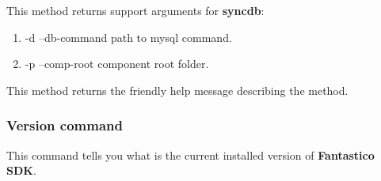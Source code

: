 \documentclass[letterpaper,10pt,english]{sphinxmanual}
\begin{document}
\begin{fulllineitems}
\begin{fulllineitems}
\begin{quote}
\begin{description}
\end{description}\end{quote}

\end{fulllineitems}


\begin{fulllineitems}
\label{features/sdk/command_syncdb:fantastico.sdk.commands.command_syncdb.SdkCommandSyncDb.get_arguments}
This method returns support arguments for \textbf{syncdb}:
\begin{enumerate}
\item {} 
-d --db-command path to mysql command.

\item {} 
-p --comp-root component root folder.

\end{enumerate}

\end{fulllineitems}


\begin{fulllineitems}
\label{features/sdk/command_syncdb:fantastico.sdk.commands.command_syncdb.SdkCommandSyncDb.get_help}
This method returns the friendly help message describing the method.

\end{fulllineitems}


\end{fulllineitems}



\subsubsection{Version command}
\label{features/sdk/command_version::doc}\label{features/sdk/command_version:version-command}
This command tells you what is the current installed version of \textbf{Fantastico SDK}.
\end{document}
